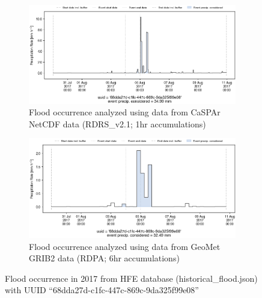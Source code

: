 \documentclass[10pt,a4paper,titlepage,parskip]{scrartcl}
\begin{document}
\begin{figure}[h]
	\begin{subfigure}[a]{1.0\textwidth}
		\centering
		\includegraphics[width=\linewidth]{figures/compare_Geomet_CaSPAr/interpolated_at_stations_occurrence_1057_identified-timesteps_RDRS_v2.1.png}
		\caption{Flood occurrence analyzed using data from CaSPAr NetCDF data (RDRS\_v2.1; 1hr accumulations)}
	\end{subfigure}
	\par\bigskip\bigskip
	\begin{subfigure}[b]{1.0\textwidth}
		\centering
		\includegraphics[width=\linewidth]{figures/compare_Geomet_CaSPAr/interpolated_at_stations_occurrence_1057_identified-timesteps_rdpa_10km_6f.png}
		\caption{Flood occurrence analyzed using data from GeoMet GRIB2 data (RDPA; 6hr accumulations)}
	\end{subfigure}
	\par\bigskip\bigskip
	\caption{Flood occurrence in 2017 from HFE database (historical\_flood.json) with UUID ``68dda27d-c1fc-447c-869c-9da325f99e08''}
\end{figure}
\pagebreak
\end{document}
